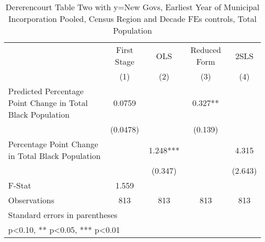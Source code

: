 \begin{table}[htbp]\centering
\def\sym#1{\ifmmode^{#1}\else\(^{#1}\)\fi}
\caption{Dererencourt Table Two with y=New Govs, Earliest Year of Municipal Incorporation  Pooled, Census Region and Decade FEs controls, Total Population}
\begin{tabular}{l*{4}{c}}
\toprule
                    & First Stage   &         OLS   &Reduced Form   &        2SLS   \\
                    &\multicolumn{1}{c}{(1)}   &\multicolumn{1}{c}{(2)}   &\multicolumn{1}{c}{(3)}   &\multicolumn{1}{c}{(4)}   \\
\midrule
Predicted Percentage Point Change in Total Black Population&      0.0759   &               &       0.327** &               \\
                    &    (0.0478)   &               &     (0.139)   &               \\
\addlinespace
Percentage Point Change in Total Black Population&               &       1.248***&               &       4.315   \\
                    &               &     (0.347)   &               &     (2.643)   \\
\midrule
F-Stat              &       1.559   &               &               &               \\
Observations        &         813   &         813   &         813   &         813   \\
\bottomrule
\multicolumn{5}{l}{\footnotesize Standard errors in parentheses}\\
\multicolumn{5}{l}{\footnotesize * p<0.10, ** p<0.05, *** p<0.01}\\
\end{tabular}
\end{table}
